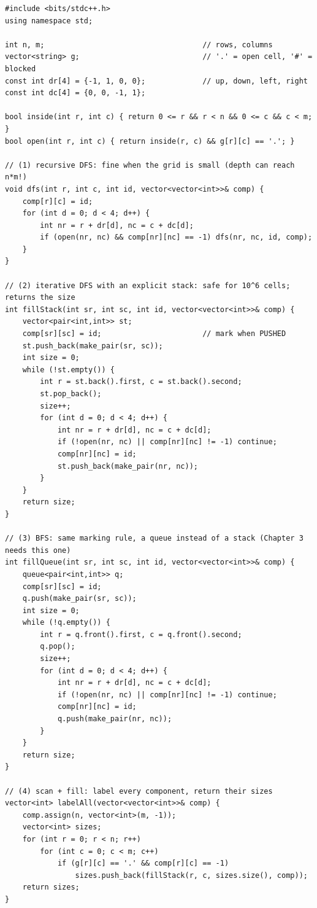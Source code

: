 \begin{lstlisting}[style=cpp]
#include <bits/stdc++.h>
using namespace std;

int n, m;                                    // rows, columns
vector<string> g;                            // '.' = open cell, '#' = blocked
const int dr[4] = {-1, 1, 0, 0};             // up, down, left, right
const int dc[4] = {0, 0, -1, 1};

bool inside(int r, int c) { return 0 <= r && r < n && 0 <= c && c < m; }
bool open(int r, int c) { return inside(r, c) && g[r][c] == '.'; }

// (1) recursive DFS: fine when the grid is small (depth can reach n*m!)
void dfs(int r, int c, int id, vector<vector<int>>& comp) {
    comp[r][c] = id;
    for (int d = 0; d < 4; d++) {
        int nr = r + dr[d], nc = c + dc[d];
        if (open(nr, nc) && comp[nr][nc] == -1) dfs(nr, nc, id, comp);
    }
}

// (2) iterative DFS with an explicit stack: safe for 10^6 cells; returns the size
int fillStack(int sr, int sc, int id, vector<vector<int>>& comp) {
    vector<pair<int,int>> st;
    comp[sr][sc] = id;                       // mark when PUSHED
    st.push_back(make_pair(sr, sc));
    int size = 0;
    while (!st.empty()) {
        int r = st.back().first, c = st.back().second;
        st.pop_back();
        size++;
        for (int d = 0; d < 4; d++) {
            int nr = r + dr[d], nc = c + dc[d];
            if (!open(nr, nc) || comp[nr][nc] != -1) continue;
            comp[nr][nc] = id;
            st.push_back(make_pair(nr, nc));
        }
    }
    return size;
}

// (3) BFS: same marking rule, a queue instead of a stack (Chapter 3 needs this one)
int fillQueue(int sr, int sc, int id, vector<vector<int>>& comp) {
    queue<pair<int,int>> q;
    comp[sr][sc] = id;
    q.push(make_pair(sr, sc));
    int size = 0;
    while (!q.empty()) {
        int r = q.front().first, c = q.front().second;
        q.pop();
        size++;
        for (int d = 0; d < 4; d++) {
            int nr = r + dr[d], nc = c + dc[d];
            if (!open(nr, nc) || comp[nr][nc] != -1) continue;
            comp[nr][nc] = id;
            q.push(make_pair(nr, nc));
        }
    }
    return size;
}

// (4) scan + fill: label every component, return their sizes
vector<int> labelAll(vector<vector<int>>& comp) {
    comp.assign(n, vector<int>(m, -1));
    vector<int> sizes;
    for (int r = 0; r < n; r++)
        for (int c = 0; c < m; c++)
            if (g[r][c] == '.' && comp[r][c] == -1)
                sizes.push_back(fillStack(r, c, sizes.size(), comp));
    return sizes;
}


\end{lstlisting}
